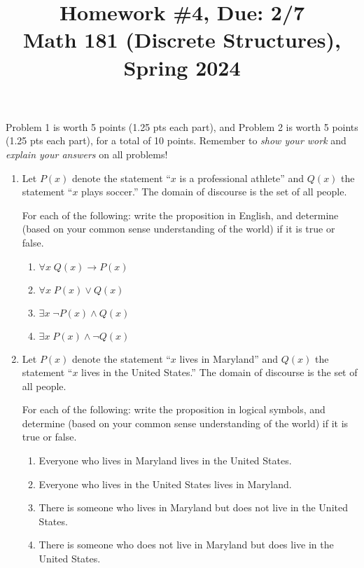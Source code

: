 \documentclass[11pt]{article}
\title{Homework \#4, Due: 2/7 \\Math 181 (Discrete Structures), Spring 2024}
\date{}
\begin{document}
\maketitle

\thispagestyle{empty}

\vspace{-1cm}

Problem 1 is worth 5 points (1.25 pts each part), and Problem 2 is worth 5 points (1.25 pts each part), for a total of 10 points. Remember to \emph{show your work} and \emph{explain your answers} on all problems!

\begin{enumerate}
\item Let $P(x)$ denote the statement ``$x$ is a professional athlete'' and $Q(x)$ the statement ``$x$ plays soccer.'' The domain of discourse is the set of all people. 

For each of the following: write the proposition in English, and determine (based on your common sense understanding of the world) if it is true or false.
\begin{enumerate}
\item $\forall x \; Q(x) \to P(x)$
\item $\forall x \; P(x) \vee Q(x)$
\item $\exists x \; \neg P(x) \wedge Q(x)$
\item $\exists x \; P(x) \wedge \neg Q(x)$
\end{enumerate}

\item Let $P(x)$ denote the statement ``$x$ lives in Maryland'' and $Q(x)$ the statement ``$x$ lives in the United States.'' The domain of discourse is the set of all people. 

For each of the following: write the proposition in logical symbols, and determine (based on your common sense understanding of the world) if it is true or false.
\begin{enumerate}
\item Everyone who lives in Maryland lives in the United States.
\item Everyone who lives in the United States lives in Maryland.
\item There is someone who lives in Maryland but does not live in the United States.
\item There is someone who does not live in Maryland but does live in the United States.
\end{enumerate}

\end{enumerate}
\end{document}
